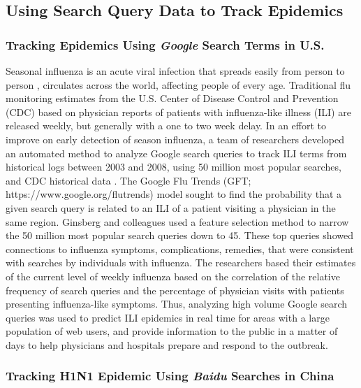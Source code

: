 \documentclass[sigconf]{acmart}
\begin{document}
\subsection{Using Search Query Data to Track Epidemics}

\subsubsection{Tracking Epidemics Using {\itshape Google} Search Terms in U.S.}

Seasonal influenza is an acute viral infection that spreads easily from person to 
person , circulates across the world, affecting people of every age. Traditional 
flu monitoring estimates from the U.S. Center of Disease Control and Prevention 
(CDC) based on physician reports of patients with influenza-like illness (ILI) are 
released weekly, but generally with a one to two week delay. In an effort to improve 
on early detection of season influenza, a team of researchers developed an automated 
method to analyze Google search queries to track ILI terms from historical logs 
between 2003 and 2008, using 50 million most popular searches, and CDC historical 
data \cite{ginsburg09}. The Google Flu Trends (GFT; https://www.google.org/flutrends) 
model sought to find the probability that a given search query is related to an ILI 
of a patient visiting a physician in the same region. Ginsberg and colleagues used 
a feature selection method to narrow  the 50 million most popular search queries down 
to 45. These top queries showed connections to influenza symptoms, complications, 
remedies, that were consistent with searches by individuals with influenza. The 
researchers based their estimates of the current level of weekly influenza based on 
the correlation of the relative frequency of search queries and the percentage of 
physician visits with patients presenting influenza-like symptoms. Thus, analyzing 
high volume Google search queries was used to predict ILI epidemics in real time for 
areas with a large population of web users, and provide information to the public in 
a matter of days to help physicians and hospitals prepare and respond to the outbreak. 

\subsubsection{Tracking H1N1 Epidemic Using {\itshape Baidu} Searches in China}
\end{document}
